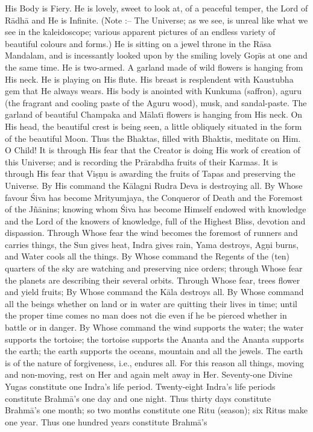 His Body is Fiery. He is lovely, sweet to look at, of a peaceful temper, the Lord of R\=adh\=a and He is Infinite. (Note :-- The Universe; as we see, is unreal like what we see in the kaleidoscope; various apparent pictures of an endless variety of beautiful colours and forms.) He is sitting on a jewel throne in the R\=asa Mandalam, and is incessantly looked upon by the smiling lovely Gop\={\i}s at one and the same time. He is two-armed. A garland made of wild flowers is hanging from His neck. He is playing on His flute. His breast is resplendent with Kaustubha gem that He always wears. His body is anointed with Kunkuma (saffron), aguru (the fragrant and cooling paste of the Aguru wood), musk, and sandal-paste. The garland of beautiful Champaka and M\=alat\={\i} flowers is hanging from His neck. On His head, the beautiful crest is being seen, a little obliquely situated in the form of the beautiful Moon. Thus the Bhaktas, filled with Bhaktis, meditate on Him. O Child! It is through His fear that the Creator is doing His work of creation of this Universe; and is recording the Pr\=arabdha fruits of their Karmas. It is through His fear that Vi\d{s}\d{n}u is awarding the fruits of Tapas and preserving the Universe. By His command the K\=alagni Rudra Deva is destroying all. By Whose favour \'Siva has become Mrityumjaya, the Conqueror of Death and the Foremost of the J\~n\=anins; knowing whom \'Siva has become Himself endowed with knowledge and the Lord of the knowers of knowledge, full of the Highest Bliss, devotion and dispassion. Through Whose fear the wind becomes the foremost of runners and carries things, the Sun gives heat, Indra gives rain, Yama destroys, Ag\d{n}i burns, and Water cools all the things. By Whose command the Regents of the (ten) quarters of the sky are watching and preserving nice orders; through Whose fear the planets are describing their several orbits. Through Whose fear, trees flower and yield fruits; By Whose command the K\=ala destroys all. By Whose command all the beings whether on land or in water are quitting their lives in time; until the proper time comes no man does not die even if he be pierced whether in battle or in danger. By Whose command the wind supports the water; the water supports the tortoise; the tortoise supports the Ananta and the Ananta supports the earth; the earth supports the oceans, mountain and all the jewels. The earth is of the nature of forgiveness, i.e., endures all. For this reason all things, moving and non-moving, rest on Her and again melt away in Her. Seventy-one Divine Yugas constitute one Indra's life period. Twenty-eight Indra's life periods constitute Brahm\=a's one day and one night. Thus thirty days constitute Brahm\=a's one month; so two months constitute one Ritu (season); six Ritus make one year. Thus one hundred years constitute Brahm\=a's

